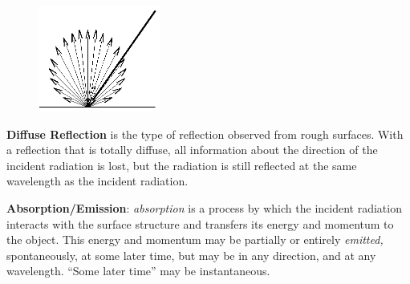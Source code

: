      \par
     \bigskip
     \bigskip
     \begin{figure}
     \includegraphics[width = 40mm]{figs/sda/2_sda.jpg}
     \end{figure}
     \textbf{Diffuse Reflection} is the type of reflection observed
     from rough surfaces. With a reflection that is totally diffuse,
     all information about the direction of the incident radiation is
     lost, but the radiation is still reflected at the same wavelength
     as the incident radiation.
     \bigskip
     \bigskip
     \bigskip
     \bigskip
     \par
     \textbf{Absorption/Emission}: \textit{absorption} is a process by
     which the incident radiation interacts with the surface structure and
     transfers its energy and momentum to the object. This energy and
     momentum may be partially or entirely \textit{emitted,}
     spontaneously, at some later time, but may be in any direction, and
     at any wavelength. ``Some later time'' may be instantaneous.

